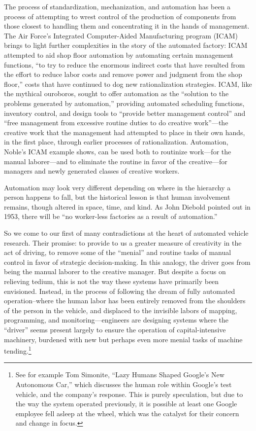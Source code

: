 The process of standardization,
mechanization, and automation has been a process of attempting to
wrest control of the production of components from those closest to
handling them and concentrating it in the hands of management. The Air Force's Integrated Computer-Aided Manufacturing program (ICAM)
brings to light further complexities in the story of the automated
factory: ICAM attempted to aid shop floor automation by automating certain
management functions, ``to try to reduce the enormous indirect costs
that have resulted from the effort to reduce labor costs and remove
power and judgment from the shop floor,'' costs that have continued to
dog new rationalization strategies.\cite[p. 330]{nobleForces} ICAM, like the mythical
ouroboros, sought to offer automation as the ``solution to the problems
generated by automation,'' providing automated scheduling functions,
inventory control, and design tools to ``provide better management
control'' and ``free management from excessive routine duties to do
creative work''---the creative work that the management had attempted to
place in their own hands, in the first place, through earlier
processes of rationalization.\cite[p. 330]{nobleForces}  Automation, Noble's ICAM example shows,
can be used both to routinize work---for the manual laborer---and to
eliminate the routine in favor of the creative---for managers and newly
generated classes of creative workers. 

Automation may look very different depending on where in the hierarchy
a person happens to fall, but the historical lesson is that human
involvement remains, though altered in space, time, and kind. As John
Diebold pointed out in 1953, there will be ``no worker-less
factories as a result of automation.''\cite[p. 63-64]{dieboldNew}

So we come to our first of many contradictions at the heart of
automated vehicle research. Their promise:
to provide to us a greater measure of creativity in the act of
driving, to remove some of the ``menial'' and routine tasks of manual
control in favor of strategic decision-making. In this analogy, the
driver goes from being the manual laborer to the creative manager. But
despite a focus on relieving tedium, this is not the way these systems
have primarily been envisioned. Instead, in the process of following
the dream of fully automated operation--where the human labor has been
entirely removed from the shoulders of the person in the vehicle, and
displaced to the invisible labors of mapping, programming, and
monitoring---engineers are designing systems where the ``driver''
seems present largely to ensure the operation of capital-intensive
machinery, burdened with new but perhaps even more menial tasks of
machine tending.\footnote{See for example Tom Simonite, “Lazy Humans
Shaped Google's New Autonomous Car,”\cite{simonite}  which discusses
the human role within Google's test vehicle,
and the company's response. This is purely speculation, but due to
the way the system operated previously, it is possible at least one Google
employee fell asleep at the wheel, which was the catalyst for their
concern and change in focus.} 


